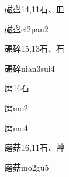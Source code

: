\begin{entry}{磁盘}{14,11}{⽯、⽫}
  \begin{phonetics}{磁盘}{ci2pan2}
  \end{phonetics}
\end{entry}

\begin{entry}{碾碎}{15,13}{⽯、⽯}
  \begin{phonetics}{碾碎}{nian3sui4}
  \end{phonetics}
\end{entry}

\begin{entry}{磨}{16}{⽯}
  \begin{phonetics}{磨}{mo2}
  \end{phonetics}
  \begin{phonetics}{磨}{mo4}
  \end{phonetics}
\end{entry}

\begin{entry}{磨菇}{16,11}{⽯、⾋}
  \begin{phonetics}{磨菇}{mo2gu5}
  \end{phonetics}
\end{entry}


